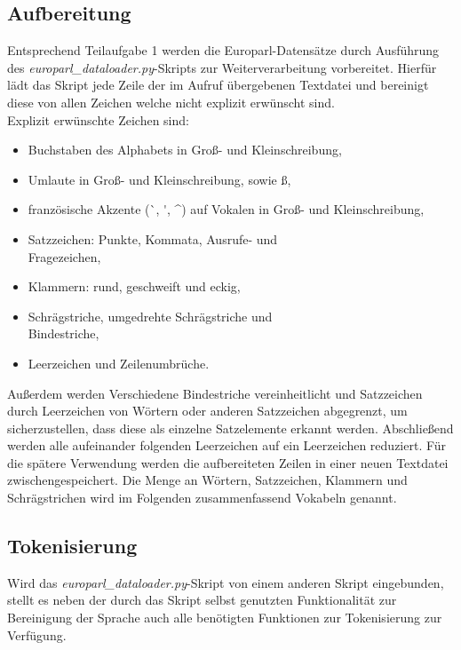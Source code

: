 \documentclass[conference]{IEEEtran}
\begin{document}
\subsection{Aufbereitung}
Entsprechend Teilaufgabe 1 werden die Europarl-Datensätze durch Ausführung des \textit{europarl\_dataloader.py}-Skripts zur Weiterverarbeitung vorbereitet.
Hierfür lädt das Skript jede Zeile der im Aufruf übergebenen Textdatei und bereinigt diese von allen Zeichen welche nicht explizit erwünscht sind. \\
Explizit erwünschte Zeichen sind:
\begin{itemize}
    \item Buchstaben des Alphabets in Groß- und Kleinschreibung,
    \item Umlaute in Groß- und Kleinschreibung, sowie ß,
    \item französische Akzente (\`{\space}, \'{\space}, \^{\space}) auf Vokalen in Groß- und Kleinschreibung,
    \item Satzzeichen: Punkte, Kommata, Ausrufe- und \\ Fragezeichen,
    \item Klammern: rund, geschweift und eckig,
    \item Schrägstriche, umgedrehte Schrägstriche und \\ Bindestriche,
    \item Leerzeichen und Zeilenumbrüche.
\end{itemize}
Außerdem werden Verschiedene Bindestriche vereinheitlicht und Satzzeichen durch Leerzeichen von Wörtern oder anderen Satzzeichen abgegrenzt, um sicherzustellen, dass diese als einzelne Satzelemente erkannt werden.
Abschließend werden alle aufeinander folgenden Leerzeichen auf ein Leerzeichen reduziert.
Für die spätere Verwendung werden die aufbereiteten Zeilen in einer neuen Textdatei zwischengespeichert.
Die Menge an Wörtern, Satzzeichen, Klammern und Schrägstrichen wird im Folgenden zusammenfassend Vokabeln genannt.

\subsection{Tokenisierung}
Wird das \textit{europarl\_dataloader.py}-Skript von einem anderen Skript eingebunden, stellt es neben der durch das Skript selbst genutzten Funktionalität zur Bereinigung der Sprache auch alle benötigten Funktionen zur Tokenisierung zur Verfügung.
\end{document}
